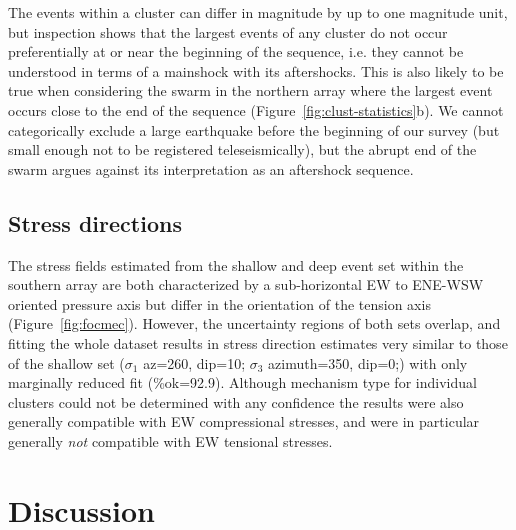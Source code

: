 \documentclass[reviewcopy]{elsarticle}
\begin{document}
The events within a cluster can differ in
magnitude by up to one magnitude unit,
 but inspection shows that the
largest events of any cluster do not occur preferentially at or near
the beginning of the sequence, i.e. they
cannot be understood in terms of a mainshock with its aftershocks.
This is also likely to be true when considering the swarm in the
northern array where the largest event occurs close to the end of the
sequence (Figure~\ref{fig:clust-statistics}b).  We cannot categorically exclude a large earthquake before
the beginning of our survey (but small enough not to be registered
teleseismically), but the abrupt end of the swarm argues against its
interpretation as an aftershock sequence.

\subsection{Stress directions}

The stress fields estimated from the shallow and deep event set within
the southern array are both characterized by a sub-horizontal EW to
ENE-WSW oriented pressure axis but differ in the orientation of the
tension axis (Figure~\ref{fig:focmec}). However, the uncertainty
regions of both sets overlap, and fitting the whole dataset results in
stress direction estimates very similar to those of the shallow set
($\sigma_1$ az=260\dg, dip=10\dg; $\sigma_3$ azimuth=350\dg, dip=0\dg;) with only marginally reduced fit
(\%ok=92.9).  Although  mechanism type for individual clusters
could not be determined with any confidence the results were
also generally compatible with EW compressional stresses, and were in
particular generally {\em not} compatible with EW tensional stresses.

\section{Discussion}
\end{document}
